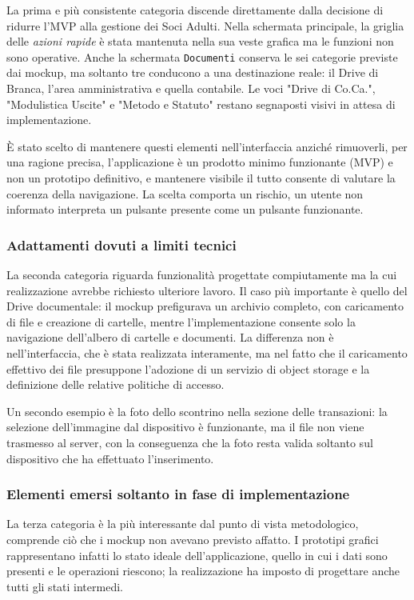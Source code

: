 \documentclass[11pt]{article}
\numberwithin{figure}{section}
\begin{document}
La prima e più consistente categoria discende direttamente dalla decisione di ridurre l'MVP alla gestione dei Soci Adulti. Nella schermata principale, la griglia delle \textit{azioni rapide} è stata mantenuta nella sua veste grafica ma le funzioni non sono operative. Anche la schermata \texttt{Documenti} conserva le sei categorie previste dai mockup, ma soltanto tre conducono a una destinazione reale: il Drive di Branca, l'area amministrativa e quella contabile. Le voci "Drive di Co.Ca.", "Modulistica Uscite" e "Metodo e Statuto" restano segnaposti visivi in attesa di implementazione.


È stato scelto di mantenere questi elementi nell'interfaccia anziché rimuoverli, per una ragione precisa, l'applicazione è un prodotto minimo funzionante (MVP) e non un prototipo definitivo, e mantenere visibile il tutto consente di valutare la coerenza della navigazione. La scelta comporta un rischio, un utente non informato interpreta un pulsante presente come un pulsante funzionante. 

\subsubsection{Adattamenti dovuti a limiti tecnici}

La seconda categoria riguarda funzionalità progettate compiutamente ma la cui realizzazione avrebbe richiesto ulteriore lavoro. Il caso più importante è quello del Drive documentale: il mockup prefigurava un archivio completo, con caricamento di file e creazione di cartelle, mentre l'implementazione consente solo la navigazione dell'albero di cartelle e documenti. La differenza non è nell'interfaccia, che è stata realizzata interamente, ma nel fatto che il caricamento effettivo dei file presuppone l'adozione di un servizio di object storage e la definizione delle relative politiche di accesso.

Un secondo esempio è la foto dello scontrino nella sezione delle transazioni: la selezione dell'immagine dal dispositivo è funzionante, ma il file non viene trasmesso al server, con la conseguenza che la foto resta valida soltanto sul dispositivo che ha effettuato l'inserimento.

\subsubsection{Elementi emersi soltanto in fase di implementazione}

La terza categoria è la più interessante dal punto di vista metodologico, comprende ciò che i mockup non avevano previsto affatto. I prototipi grafici rappresentano infatti lo stato ideale dell'applicazione, quello in cui i dati sono presenti e le operazioni riescono; la realizzazione ha imposto di progettare anche tutti gli stati intermedi.
\end{document}
